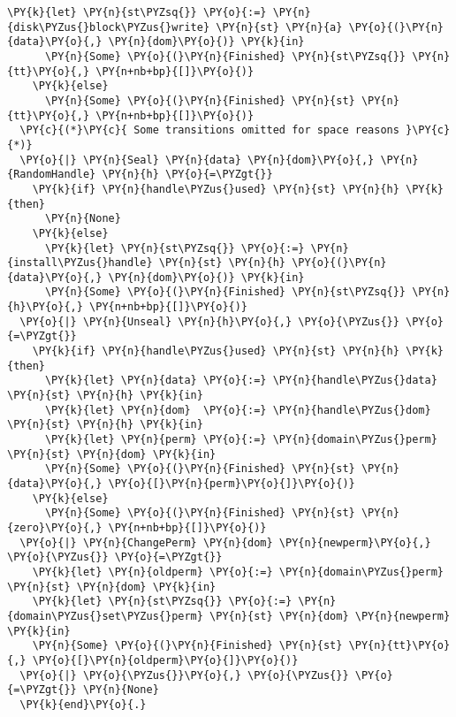 \begin{BVerbatim}[commandchars=\\\{\},codes={\catcode`\$=3\catcode`\^=7\catcode`\_=8},fontsize=\footnotesize]
      \PY{k}{let} \PY{n}{st\PYZsq{}} \PY{o}{:=} \PY{n}{disk\PYZus{}block\PYZus{}write} \PY{n}{st} \PY{n}{a} \PY{o}{(}\PY{n}{data}\PY{o}{,} \PY{n}{dom}\PY{o}{)} \PY{k}{in}
      \PY{n}{Some} \PY{o}{(}\PY{n}{Finished} \PY{n}{st\PYZsq{}} \PY{n}{tt}\PY{o}{,} \PY{n+nb+bp}{[]}\PY{o}{)}
    \PY{k}{else}
      \PY{n}{Some} \PY{o}{(}\PY{n}{Finished} \PY{n}{st} \PY{n}{tt}\PY{o}{,} \PY{n+nb+bp}{[]}\PY{o}{)}
  \PY{c}{(*}\PY{c}{ Some transitions omitted for space reasons }\PY{c}{*)}
  \PY{o}{|} \PY{n}{Seal} \PY{n}{data} \PY{n}{dom}\PY{o}{,} \PY{n}{RandomHandle} \PY{n}{h} \PY{o}{=\PYZgt{}}
    \PY{k}{if} \PY{n}{handle\PYZus{}used} \PY{n}{st} \PY{n}{h} \PY{k}{then}
      \PY{n}{None}
    \PY{k}{else}
      \PY{k}{let} \PY{n}{st\PYZsq{}} \PY{o}{:=} \PY{n}{install\PYZus{}handle} \PY{n}{st} \PY{n}{h} \PY{o}{(}\PY{n}{data}\PY{o}{,} \PY{n}{dom}\PY{o}{)} \PY{k}{in}
      \PY{n}{Some} \PY{o}{(}\PY{n}{Finished} \PY{n}{st\PYZsq{}} \PY{n}{h}\PY{o}{,} \PY{n+nb+bp}{[]}\PY{o}{)}
  \PY{o}{|} \PY{n}{Unseal} \PY{n}{h}\PY{o}{,} \PY{o}{\PYZus{}} \PY{o}{=\PYZgt{}}
    \PY{k}{if} \PY{n}{handle\PYZus{}used} \PY{n}{st} \PY{n}{h} \PY{k}{then}
      \PY{k}{let} \PY{n}{data} \PY{o}{:=} \PY{n}{handle\PYZus{}data} \PY{n}{st} \PY{n}{h} \PY{k}{in}
      \PY{k}{let} \PY{n}{dom}  \PY{o}{:=} \PY{n}{handle\PYZus{}dom}  \PY{n}{st} \PY{n}{h} \PY{k}{in}
      \PY{k}{let} \PY{n}{perm} \PY{o}{:=} \PY{n}{domain\PYZus{}perm} \PY{n}{st} \PY{n}{dom} \PY{k}{in}
      \PY{n}{Some} \PY{o}{(}\PY{n}{Finished} \PY{n}{st} \PY{n}{data}\PY{o}{,} \PY{o}{[}\PY{n}{perm}\PY{o}{]}\PY{o}{)}
    \PY{k}{else}
      \PY{n}{Some} \PY{o}{(}\PY{n}{Finished} \PY{n}{st} \PY{n}{zero}\PY{o}{,} \PY{n+nb+bp}{[]}\PY{o}{)}
  \PY{o}{|} \PY{n}{ChangePerm} \PY{n}{dom} \PY{n}{newperm}\PY{o}{,} \PY{o}{\PYZus{}} \PY{o}{=\PYZgt{}}
    \PY{k}{let} \PY{n}{oldperm} \PY{o}{:=} \PY{n}{domain\PYZus{}perm} \PY{n}{st} \PY{n}{dom} \PY{k}{in}
    \PY{k}{let} \PY{n}{st\PYZsq{}} \PY{o}{:=} \PY{n}{domain\PYZus{}set\PYZus{}perm} \PY{n}{st} \PY{n}{dom} \PY{n}{newperm} \PY{k}{in}
    \PY{n}{Some} \PY{o}{(}\PY{n}{Finished} \PY{n}{st} \PY{n}{tt}\PY{o}{,} \PY{o}{[}\PY{n}{oldperm}\PY{o}{]}\PY{o}{)}
  \PY{o}{|} \PY{o}{\PYZus{}}\PY{o}{,} \PY{o}{\PYZus{}} \PY{o}{=\PYZgt{}} \PY{n}{None}
  \PY{k}{end}\PY{o}{.}
\end{BVerbatim}

